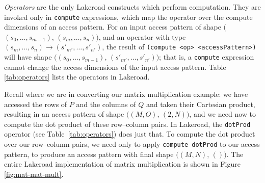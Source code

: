 \documentclass[prologue, dvipsnames, sigplan, screen, review, anonymous]{acmart}
\newcommand{\g}{Lakeroad\xspace}
\newcommand{\accesspatternshape}[2]{$($$\left( #1 \right)$, $\left( #2 \right)$$)$}
\newcommand{\tcd}[1]{\texttt{#1}}
\begin{document}
\textit{Operators}
  are the only \g
  constructs
  which
  perform computation.
They are invoked only
  in \texttt{compute} expressions,
  which map the operator
  over the compute dimensions
  of an access pattern.
For an input access pattern
  of shape
  \accesspatternshape
  {s_0, \dots, s_{m-1}}
  {s_m, \dots, s_{n}},
  and an operator
  with type
  $(s_m,\dots,s_n)
  \rightarrow
  (s'_{m'}, \dots, s'_{n'})$,
  the result of
  \texttt{(compute <op> <accessPattern>)}
  will have shape
  \accesspatternshape
  {s_0, \dots, s_{m-1}}
  {s'_{m'}, \dots, s'_{n'}};
  that is, a \tcd{compute}
  expression
  cannot change
  the access dimensions
  of the input access pattern.
Table \ref{tab:operators}
  lists
  the operators
  in \g{}.
  
Recall where we are
  in converting
  our matrix multiplication
  example:
  we have accessed the rows of $P$
  and the columns of $Q$
  and taken their Cartesian product,
  resulting in an access pattern
  of shape
  \accesspatternshape
  {M, O}{2, N},
  and we need now
  to compute the dot product
  of these row--column
  pairs.
In \g,
  the \texttt{dotProd}
  operator
  (see Table~\ref{tab:operators})
  does just that.
To compute the dot product
  over our row--column pairs,
  we need only to apply
  \texttt{compute dotProd}
  to our access pattern,
  to produce an access pattern
  with final shape
  \accesspatternshape
  {M, N}{}.
The entire \g
  implementation
  of matrix multiplication
  is shown in Figure \ref{fig:mat-mat-mult}.
  
  
\end{document}
